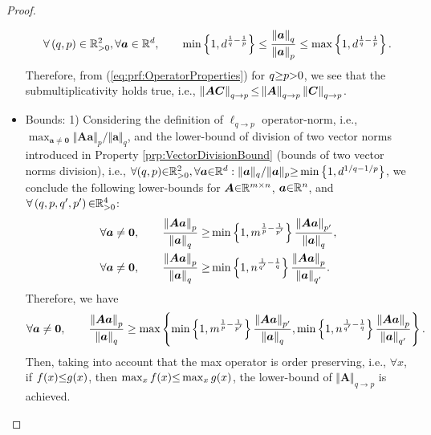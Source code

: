 \begin{proof}
\begin{itemize}
\begin{gather*}
\forall \left( q , p \right) \in \mathbb{R}^2_{>0} , \forall \boldsymbol{a} \in \mathbb{R}^d, \qquad 
\min \left\lbrace 1 , d^{\frac1q - \frac1p} \right\rbrace \leq \frac{\left\lVert\boldsymbol{a}\right\rVert_q}{\left\lVert\boldsymbol{a}\right\rVert_p} \leq \max \left\lbrace 1 , d^{\frac1q - \frac1p} \right\rbrace.
\end{gather*}
Therefore, from (\ref{eq:prf:OperatorProperties}) for $q {\geq} p {>} 0$, we see that the submultiplicativity holds true, i.e., $\left\lVert\boldsymbol{A} \boldsymbol{C}\right\rVert_{q \to p} {\leq} \left\lVert\boldsymbol{A}\right\rVert_{q \to p} \left\lVert\boldsymbol{C}\right\rVert_{q \to p}$.
\item Bounds: 1) Considering the definition of $\ell_{q {\to} p}$ operator-norm, i.e., $\max_{\boldsymbol{a} \neq \boldsymbol{0}} \Vert \boldsymbol{A} \boldsymbol{a} \Vert_{p} / \Vert \boldsymbol{a} \Vert_{q}$, and the lower-bound of division of two vector norms introduced in Property \ref{prp:VectorDivisionBound} (bounds of two vector norms division), i.e., $\forall (q , p) {\in} \mathbb{R}^2_{{>} 0}, \forall \boldsymbol{a} {\in} \mathbb{R}^d : \Vert \boldsymbol{a} \Vert_q / \Vert \boldsymbol{a} \Vert_p {\geq} \min \left\lbrace 1 , d^{1/q - 1/p} \right\rbrace$, we conclude the following lower-bounds for $\boldsymbol{A} {\in} \mathbb{R}^{m {\times} n}$, $\boldsymbol{a} {\in} \mathbb{R}^n$, and $\forall \left( q , p , q' , p' \right) {\in} \mathbb{R}^4_{>0}$:
\begin{gather*}
\begin{aligned}
\forall \boldsymbol{a} \neq \boldsymbol{0}, \qquad \frac{\left\lVert\boldsymbol{A} \boldsymbol{a}\right\rVert_p}{\left\lVert\boldsymbol{a}\right\rVert_q} \geq
&\min \left\lbrace 1 , m^{\frac1p - \frac{1}{p'}} \right\rbrace \frac{\left\lVert\boldsymbol{A} \boldsymbol{a}\right\rVert_{p'}}{\left\lVert\boldsymbol{a}\right\rVert_q}, \\
\forall \boldsymbol{a} \neq \boldsymbol{0}, \qquad \frac{\left\lVert\boldsymbol{A} \boldsymbol{a}\right\rVert_p}{\left\lVert\boldsymbol{a}\right\rVert_q} \geq
&\min \left\lbrace 1 , n^{\frac{1}{q'} - \frac1q} \right\rbrace \frac{\left\lVert\boldsymbol{A} \boldsymbol{a}\right\rVert_p}{\left\lVert\boldsymbol{a}\right\rVert_{q'}}.
\end{aligned}
\end{gather*}
Therefore, we have
\begin{gather*}
\forall \boldsymbol{a} \neq \boldsymbol{0}, \qquad \frac{\left\lVert\boldsymbol{A} \boldsymbol{a}\right\rVert_p}{\left\lVert\boldsymbol{a}\right\rVert_q} \geq
\max \left\lbrace \min \left\lbrace 1 , m^{\frac1p - \frac{1}{p'}} \right\rbrace \frac{\left\lVert\boldsymbol{A} \boldsymbol{a}\right\rVert_{p'}}{\left\lVert\boldsymbol{a}\right\rVert_q}, 
\min \left\lbrace 1 , n^{\frac{1}{q'} - \frac1q} \right\rbrace \frac{\left\lVert\boldsymbol{A} \boldsymbol{a}\right\rVert_p}{\left\lVert\boldsymbol{a}\right\rVert_{q'}} \right\rbrace.
\end{gather*}
Then, taking into account that the max operator is order preserving, i.e., $\forall x$, if $f(x) {\leq} g(x)$, then $\max_x f(x) {\leq} \max_x g(x)$, the lower-bound of $\Vert \boldsymbol{A} \Vert_{q {\to} p}$ is achieved.


\end{itemize}
\end{proof}

